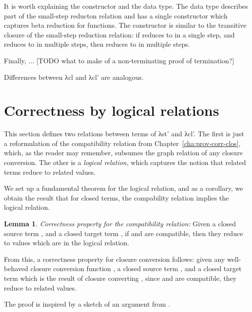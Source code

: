 \documentclass[bsc,frontabs,oneside,singlespacing,parskip,deptreport]{infthesis}
\theoremstyle{definition}
\theoremstyle{lemma}
\newtheorem*{lemma}{Lemma}
\begin{document}

It is worth explaining the  constructor and the 
data type. The  data type describes part of the small-step
reducton relation and has a single constructor which captures beta
reduction for functions. The  constructor is similar to the
transitive closure of the small-step reduction relation: if 
reduces to  in a single step, and  reduces to  in
multiple steps, then  reduces to  in multiple steps.

Finally, ... [TODO what to make of a non-terminating proof of
termination?]


Differences between λcl and λcl' are analogous.

\section{Correctness by logical relations}
\label{sec:corr-logic-relat}

This section defines two relations between terms of λst' and λcl'. The
first is just a reformulation of the compatibility relation from
Chapter~\ref{cha:prov-corr-clos}, which, as the reader may remember,
subsumes the graph relation of any closure conversion. The other is a
\textit{logical relation}, which captures the notion that related
terms reduce to related values.

We set up a fundamental theorem for the logical relation, and as a
corollary, we obtain the result that for closed terms, the compability
relation implies the logical relation.

\begin{lemma}
  \label{sec:corr-logic-relat-1}
  \emph{Correctness property for the compatibility relation:} Given a
  closed source term , and a closed target term , if
   and  are compatible, then they reduce to values which
  are in the logical relation.
\end{lemma}

From this, a correctness property for closure conversion follows:
given any well-behaved closure conversion function , a closed
source term , and a closed target term  which is the
result of closure converting , since  and  are
compatible, they reduce to related values.

The proof is inspired by a sketch of an argument from
\cite{DBLP:conf/popl/MinamideMH96}.
\end{document}
